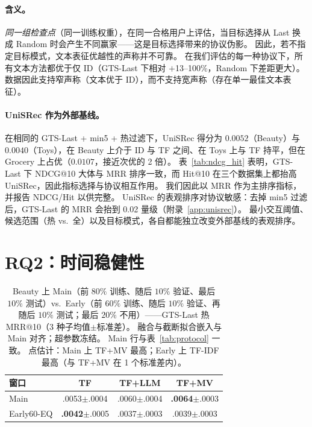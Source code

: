 \documentclass[sigconf,natbib=true,anonymous]{acmart}
\newcommand{\tfidf}{\textsc{TF-IDF}\xspace}
\newcommand{\tfmv}{\textsc{TF+MV}\xspace}
\begin{document}
\paragraph{含义。}
\emph{同一组检查点}（同一训练权重），在同一合格用户上评估，当目标选择从 Last 换成 Random 时会产生不同赢家——这是目标选择带来的协议伪影。
因此，若不指定目标模式，文本表征优越性的声称并不可靠。
在我们评估的每一种协议下，所有文本方法都优于仅 ID（GTS-Last 下相对 $+$13--100\%，Random 下差距更大）。
数据因此支持窄声称（文本优于 ID），而不支持宽声称（存在单一最佳文本表征）。

\paragraph{UniSRec 作为外部基线。}
在相同的 GTS-Last + min5 + 热过滤下，UniSRec 得分为 $0.0052$（Beauty）与 $0.0040$（Toys），在 Beauty 上介于 ID 与 TF 之间、在 Toys 上与 TF 持平，但在 Grocery 上占优（$0.0107$，接近次优的 2 倍）。
表~\ref{tab:ndcg_hit} 表明，GTS-Last 下 NDCG@10 大体与 MRR 排序一致，而 Hit@10 在三个数据集上都抬高 UniSRec，因此指标选择与协议相互作用。
我们因此以 MRR 作为主排序指标，并报告 NDCG/Hit 以供完整。
UniSRec 的表观排序对协议敏感：去掉 min5 过滤后，GTS-Last 的 MRR 会抬到 0.02 量级（附录~\ref{app:unisrec}）。
最小交互阈值、候选范围（热 vs.\ 全）以及目标模式，各自都能独立改变外部基线的表观排序。

\section{RQ2：时间稳健性}
\label{sec:rq2}

\begin{table}[t]
\centering
\caption{%
Beauty 上 Main（前 $80\%$ 训练、随后 $10\%$ 验证、最后 $10\%$ 测试）vs.\ Early（前 $60\%$ 训练、随后 $10\%$ 验证、再随后 $10\%$ 测试；最后 $20\%$ 不用）——GTS-Last 热 MRR@10（3 种子均值$\pm$标准差）。
融合与截断拟合嵌入与 Main 对齐；超参数冻结。
Main 行与表~\ref{tab:protocol} 一致。
点估计：Main 上 \tfmv 最高；Early 上 \tfidf 最高（与 \tfmv 在 1 个标准差内）。%
}
\label{tab:early}
\small
\begin{tabular}{@{}lccc@{}}
\toprule
窗口 & TF & TF+LLM & TF+MV \\
\midrule
Main      & .0053\tiny{$\pm$.0004} & .0060\tiny{$\pm$.0004} & \textbf{.0064}\tiny{$\pm$.0003} \\
Early60-EQ & \textbf{.0042}\tiny{$\pm$.0005} & .0037\tiny{$\pm$.0003} & .0039\tiny{$\pm$.0003} \\
\bottomrule
\end{tabular}
\end{table}
\end{document}
